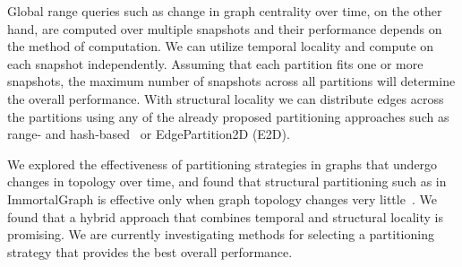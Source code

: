 Global range queries such as change in graph centrality over time, on
the other hand, are computed over multiple snapshots and their
performance depends on the method of computation.  We can utilize
temporal locality and compute on each snapshot independently.
Assuming that each partition fits one or more snapshots, the maximum
number of snapshots across all partitions will determine the overall
performance.  With structural locality we can distribute edges across
the partitions using any of the already proposed partitioning
approaches such as range- and hash-based~\cite{Seo2013} or
EdgePartition2D (E2D).  

We explored the effectiveness of partitioning strategies in graphs
that undergo changes in topology over time, and found that structural
partitioning such as in ImmortalGraph is effective only when graph
topology changes very little~\cite{MoffittTempWeb16}.  We found that a
hybrid approach that combines temporal and structural locality is
promising.  We
are currently investigating methods for selecting a partitioning
strategy that provides the best overall performance.

